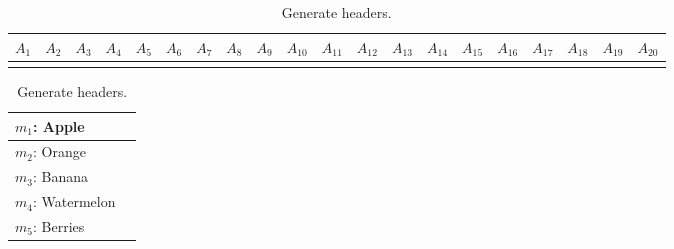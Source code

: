 \documentclass[12pt]{article}
\begin{document}
\begin{table}[t]
\scriptsize
\begin{center}
\begin{tabular}{ l|l|l|l|l|l|l|l|l|l|l|l|l|l|l|l|l|l|l|l| }
$A_{1}$ & $A_{2}$ & $A_{3}$ & $A_{4}$ & $A_{5}$ & $A_{6}$ & $A_{7}$ & $A_{8}$ & $A_{9}$ & $A_{10}$ & $A_{11}$ & $A_{12}$ & $A_{13}$ & $A_{14}$ & $A_{15}$ & $A_{16}$ & $A_{17}$ & $A_{18}$ & $A_{19}$ & $A_{20}$ \\ \toprule
 & & & & & & & & & & & & & & & & & & & \\ \midrule
\end{tabular}
\caption{Generate headers.}\label{tab:generate-headers-ex-1}
\end{center}
\end{table}

\newpage

\clearpage

\begin{table}[t]
\scriptsize
\begin{center}
\begin{tabular}{ ll }
$m_1$: Apple & \\ \midrule 
$m_2$: Orange & \\ \midrule 
$m_3$: Banana & \\ \midrule 
$m_4$: Watermelon & \\ \midrule 
$m_5$: Berries & \\ \bottomrule
\end{tabular}
\caption{Generate headers.}\label{tab:generate-headers-ex-2}
\end{center}
\end{table}

\newpage

\clearpage
\end{document}
